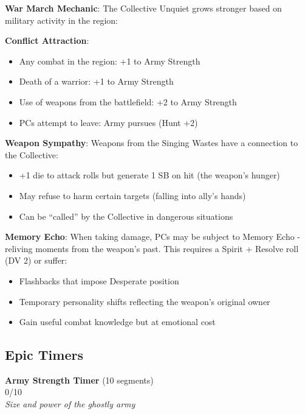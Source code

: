 \documentclass[11pt]{article}
\newcommand{\timersegment}{\textbullet}
\begin{document}
\begin{mdframed}[backgroundcolor=mechanicbg]
\textbf{War March Mechanic}: The Collective Unquiet grows stronger based on military activity in the region:

\textbf{Conflict Attraction}: 
\begin{itemize}[leftmargin=*]
\item Any combat in the region: +1 to Army Strength
\item Death of a warrior: +1 to Army Strength
\item Use of weapons from the battlefield: +2 to Army Strength
\item PCs attempt to leave: Army pursues (Hunt +2)
\end{itemize}

\textbf{Weapon Sympathy}: Weapons from the Singing Wastes have a connection to the Collective:
\begin{itemize}[leftmargin=*]
\item +1 die to attack rolls but generate 1 SB on hit (the weapon's hunger)
\item May refuse to harm certain targets (falling into ally's hands)
\item Can be ``called'' by the Collective in dangerous situations
\end{itemize}

\textbf{Memory Echo}: When taking damage, PCs may be subject to Memory Echo - reliving moments from the weapon's past. This requires a Spirit + Resolve roll (DV 2) or suffer:
\begin{itemize}[leftmargin=*]
\item Flashbacks that impose Desperate position
\item Temporary personality shifts reflecting the weapon's original owner
\item Gain useful combat knowledge but at emotional cost
\end{itemize}
\end{mdframed}

\subsection*{Epic Timers}

\begin{center}
\textbf{Army Strength Timer } (10 segments)\\
\fbox{\timersegment\timersegment\timersegment\timersegment\timersegment\timersegment\timersegment\timersegment\timersegment\timersegment} 0/10\\
\textit{Size and power of the ghostly army}
\end{center}
\end{document}

